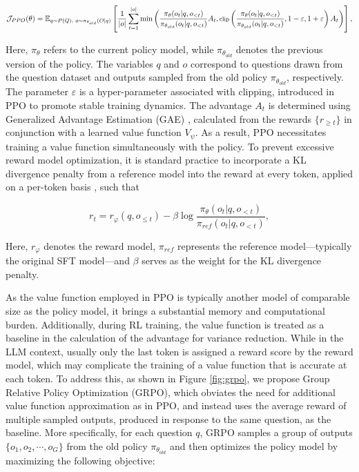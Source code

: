 \begin{itemize}[topsep=0pt]
\begin{itemize}[topsep=0pt]
\begin{equation}
\footnotesize
    \mathcal{J}_{PPO}(\theta) = \mathbb{E}_{q \sim P(Q),\ o \sim \pi_{\theta_{old}}(O|q)} \left[ \frac{1}{|o|} \sum_{t=1}^{|o|} \min \left( \frac{\pi_\theta(o_{t} | q, o_{<t})}{\pi_{\theta_{old}}(o_{t} | q, o_{<t})} A_{t}, \text{clip} \left( \frac{\pi_\theta(o_{t} | q, o_{<t})}{\pi_{\theta_{old}}(o_{t} | q, o_{<t})}, 1 - \varepsilon, 1 + \varepsilon \right)  A_{t} \right) \right],
\end{equation}

Here, $\pi_{\theta}$ refers to the current policy model, while $\pi_{\theta_{old}}$ denotes the previous version of the policy. The variables $q$ and $o$ correspond to questions drawn from the question dataset and outputs sampled from the old policy $\pi_{\theta_{old}}$, respectively. The parameter $\varepsilon$ is a hyper-parameter associated with clipping, introduced in PPO to promote stable training dynamics. The advantage $A_t$ is determined using Generalized Advantage Estimation (GAE) \citep{gae}, calculated from the rewards $\{r_{\ge t}\}$ in conjunction with a learned value function $V_{\psi}$. As a result, PPO necessitates training a value function simultaneously with the policy. To prevent excessive reward model optimization, it is standard practice to incorporate a KL divergence penalty from a reference model into the reward at every token, applied on a per-token basis \citep{ouyang2022training}, such that

\begin{equation}
    r_{t} = r_\varphi(q, o_{\le t}) - \beta \log\frac{\pi_{\theta}(o_{t}|q, o_{<t})}{\pi_{ref}(o_{t}|q, o_{<t})},
\label{eq:PPO-reward}
\end{equation}

Here, $r_\varphi$ denotes the reward model, $\pi_{ref}$ represents the reference model—typically the original SFT model—and $\beta$ serves as the weight for the KL divergence penalty.

As the value function employed in PPO is typically another model of comparable size as the policy model, it brings a substantial memory and computational burden. Additionally, during RL training, the value function is treated as a baseline in the calculation of the advantage for variance reduction. While in the LLM context, usually only the last token is assigned a reward score by the reward model, which may complicate the training of a value function that is accurate at each token. To address this, as shown in Figure \ref{fig:grpo}, we propose Group Relative Policy Optimization (GRPO), which obviates the need for additional value function approximation as in PPO, and instead uses the average reward of multiple sampled outputs, produced in response to the same question, as the baseline. More specifically, for each question $q$, GRPO samples a group of outputs $\{o_1, o_2, \cdots, o_G\}$  from the old policy  $\pi_{\theta_{old}}$  and then optimizes the policy model by maximizing the following objective:


\end{itemize}
\end{itemize}

